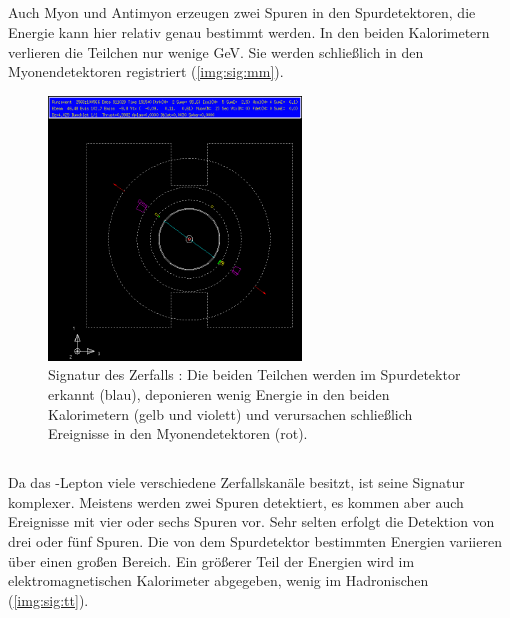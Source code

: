 \subsection*{\Zmm}
Auch Myon und Antimyon erzeugen zwei Spuren in den Spurdetektoren,
die Energie kann hier relativ genau bestimmt werden.
In den beiden Kalorimetern verlieren die Teilchen nur wenige GeV.
Sie werden schließlich in den Myonendetektoren registriert (\autoref{img:sig:mm}).

\begin{figure}[H]
\begin{center}
  \includegraphics[width=0.6\textwidth]{../img/gropepics/mm1b.png}
  \caption{Signatur des Zerfalls \Zmm: Die beiden Teilchen werden im Spurdetektor erkannt (blau),
  deponieren wenig Energie in den beiden Kalorimetern (gelb und violett) und verursachen schließlich Ereignisse
  in den Myonendetektoren (rot).}
  \label{img:sig:mm}
\end{center}
\end{figure} 

\subsection*{\Ztt}
Da das \texttau-Lepton viele verschiedene Zerfallskanäle besitzt,
ist seine Signatur komplexer.
Meistens werden zwei Spuren detektiert,
es kommen aber auch Ereignisse mit vier oder sechs Spuren vor.
Sehr selten erfolgt die Detektion von drei oder fünf Spuren.
Die von dem Spurdetektor bestimmten Energien variieren über einen großen Bereich.
Ein größerer Teil der Energien wird im elektromagnetischen Kalorimeter abgegeben,
wenig im Hadronischen (\autoref{img:sig:tt}).

